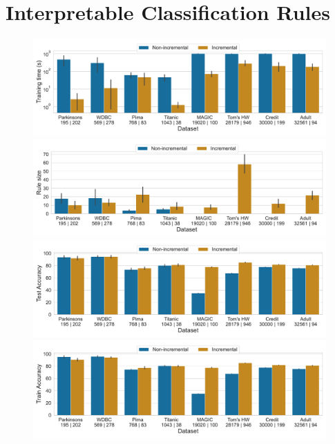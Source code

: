 \chapter{Interpretable Classification Rules}

\begin{figure}
	\centering
	\includegraphics[scale=0.38]{figures/interpretability/imli/thesis_exp/thesis_exp_cactus_train_val_fit_time}
	\includegraphics[scale=0.38]{figures/interpretability/imli/thesis_exp/thesis_exp_cactus_predicate_count}
	\includegraphics[scale=0.38]{figures/interpretability/imli/thesis_exp/thesis_exp_cactus_test_accuracy}
	\includegraphics[scale=0.38]{figures/interpretability/imli/thesis_exp/thesis_exp_cactus_train_val_accuracy}
\end{figure}


